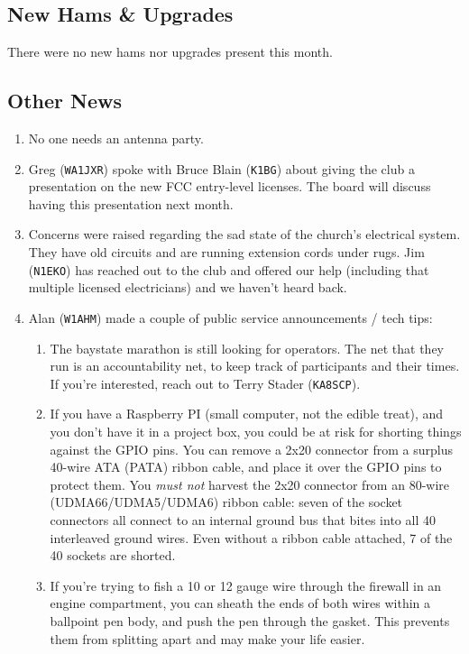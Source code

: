 \documentclass[10pt,letterpaper]{article}
\begin{document}
\subsection{New Hams \& Upgrades}
There were no new hams nor upgrades present this month.

\subsection{Other News}
\begin{enumerate}
  \item No one needs an antenna party.
  \item Greg (\texttt{WA1JXR}) spoke with Bruce Blain (\texttt{K1BG}) about giving the club a presentation on the new FCC entry-level licenses. The board will discuss having this presentation next month.
  \item Concerns were raised regarding the sad state of the church's electrical system. They have old circuits and are running extension cords under rugs. Jim (\texttt{N1EKO}) has reached out to the club and offered our help (including that multiple licensed electricians) and we haven't heard back.
  \item Alan (\texttt{W1AHM}) made a couple of public service announcements / tech tips:
  \begin{enumerate}
    \item The baystate marathon is still looking for operators. The net that they run is an accountability net, to keep track of participants and their times. If you're interested, reach out to Terry Stader (\texttt{KA8SCP}).
    \item If you have a Raspberry PI (small computer, not the edible treat), and you don't have it in a project box, you could be at risk for shorting things against the GPIO pins. You can remove a 2x20 connector from a surplus 40-wire ATA (PATA) ribbon cable, and place it over the GPIO pins to protect them. You \emph{must not} harvest the 2x20 connector from an 80-wire (UDMA66/UDMA5/UDMA6) ribbon cable: seven of the socket connectors all connect to an internal ground bus that bites into all 40 interleaved ground wires. Even without a ribbon cable attached, 7 of the 40 sockets are shorted.
    \item If you're trying to fish a 10 or 12 gauge wire through the firewall in an engine compartment, you can sheath the ends of both wires within a ballpoint pen body, and push the pen through the gasket. This prevents them from splitting apart and may make your life easier.

\end{enumerate}
\end{enumerate}
\end{document}

